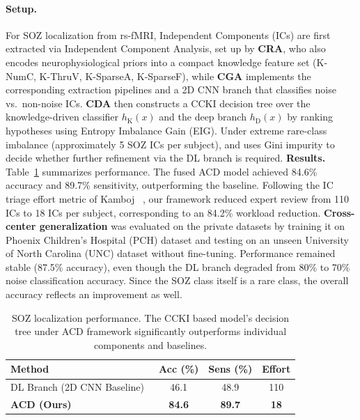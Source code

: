 \documentclass[runningheads]{llncs}
\begin{document}
\paragraph{Setup.}
For SOZ localization from rs-fMRI, Independent Components (ICs) are first extracted via Independent Component Analysis, set up by \textbf{CRA}, who also encodes neurophysiological priors into a compact knowledge feature set (K-NumC, K-ThruV, K-SparseA, K-SparseF), while \textbf{CGA} implements the corresponding extraction pipelines and a 2D CNN branch that classifies noise vs.\ non-noise ICs.
\textbf{CDA} then constructs a CCKI decision tree over the knowledge-driven classifier $h_{\mathrm{K}}(x)$ and the deep branch $h_{\mathrm{D}}(x)$ by ranking hypotheses using Entropy Imbalance Gain (EIG).
Under extreme rare-class imbalance (approximately 5 SOZ ICs per subject), and uses Gini impurity to decide whether further refinement via the DL branch is required.
\textbf{Results.} Table~\ref{tab:soz_results} summarizes performance. The fused ACD model achieved 84.6\% accuracy and 89.7\% sensitivity, outperforming the baseline. Following the IC triage effort metric of Kamboj \etal~\cite{kamboj2024expertTAI}, our framework reduced expert review from 110 ICs to 18 ICs per subject, corresponding to an 84.2\% workload reduction.  \textbf{Cross-center generalization} was evaluated on the private datasets by training it on Phoenix Children’s Hospital (PCH) dataset and testing on an unseen University of North Carolina (UNC) dataset without fine-tuning. Performance remained stable (87.5\% accuracy), even though the DL branch degraded from 80\% to 70\% noise classification accuracy. Since the SOZ class itself is a rare class, the overall accuracy reflects an improvement as well.
\begin{table}[!htbp]
\centering
\footnotesize
\captionsetup{font=footnotesize}

\caption{SOZ localization performance. The CCKI based model's decision tree under ACD framework significantly outperforms individual components and baselines.}
\begin{tabular}{lccc}
\toprule
\textbf{Method} & \textbf{Acc (\%)} & \textbf{Sens (\%)} & \textbf{Effort} \\
\midrule
DL Branch (2D CNN Baseline)~\cite{kamboj2024expert} & 46.1 & 48.9 & 110 \\
\textbf{ACD (Ours)} & \textbf{84.6} & \textbf{89.7} & \textbf{18} \\
\bottomrule
\end{tabular}

\label{tab:soz_results}
\end{table}
\vspace{-11mm}
\end{document}
